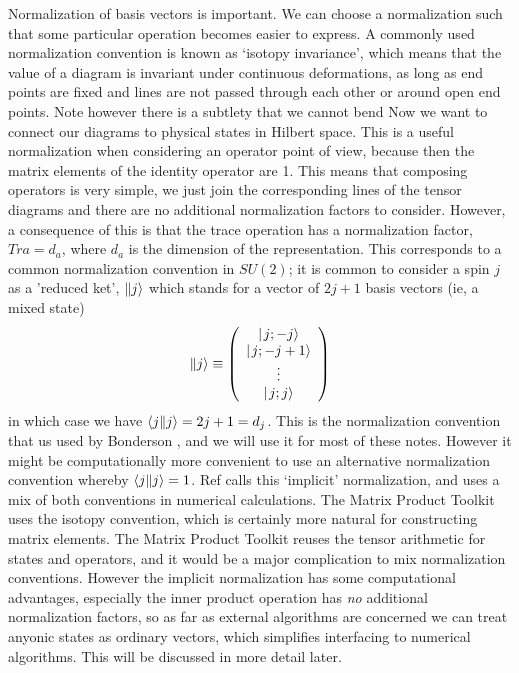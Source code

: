 \documentclass[12pt]{article}
\begin{document}
Normalization of basis vectors is important. We can choose a normalization such that some particular
operation becomes easier to express. A commonly used normalization convention
is known as `isotopy invariance', which means that the value of a diagram is invariant under continuous
deformations, as long as end points are fixed and lines are not passed through each other or around
open end points. Note however there is a subtlety that we cannot bend 
Now we want to connect our diagrams to physical states in Hilbert space.
This is a useful normalization when considering an operator point of view, because then the
matrix elements of the identity operator are 1.
This means that composing operators is very simple, we just join the corresponding lines
of the tensor diagrams and there are no additional normalization factors to consider.
However, a consequence of this is that the trace operation has a normalization factor,
$Tr a = d_a$, where $d_a$ is the dimension of the representation.
This corresponds to a common normalization convention in $SU(2)$; it is common to consider a spin $j$ as a 
'reduced ket', $\| j \rangle$ which stands for a vector of $2j+1$ basis vectors (ie, a mixed state)
\begin{equation}
\| j \rangle \equiv \left( \begin{array}{c} \hbox{$\mid \! {j;-j} \rangle$} \\ \hbox{$\mid \! {j;-j+1} \rangle$} \\ \vdots
\\ \hbox{$\mid \! {j;j} \rangle$} \end{array} \right)
\end{equation}
in which case we have $\langle j \| j \rangle = 2j+1 = d_j$. 
This is the normalization convention that us used by Bonderson \cite{Bonderson}, and we will use it
for most of these notes. However it might be computationally more convenient to use an alternative
normalization convention whereby $\langle j \| j \rangle = 1$. Ref \cite{AnyonDMRG} calls this `implicit'
normalization, and uses a mix of both conventions in numerical calculations.
The Matrix Product Toolkit uses the isotopy convention, which is certainly more natural for constructing
matrix elements. The Matrix Product Toolkit reuses the tensor arithmetic for states and operators, and
it would be a major complication to mix normalization conventions. However the implicit normalization
has some computational advantages, especially the inner product operation has \emph{no} additional
normalization factors, so as far as external algorithms are concerned we can treat anyonic states
as ordinary vectors, which simplifies interfacing to numerical algorithms. This will be discussed in more
detail later.
\end{document}
